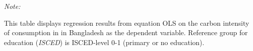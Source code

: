 \begin{table}[htbp!]
\begin{adjustbox}{width = 1\textwidth, max height = 0.95\textheight, center}
\begin{threeparttable}[b]
         \begin{tablenotes}\item \medskip \textit{Note:}
            \item This table displays regression results from equation OLS on the carbon intensity of consumption in  in Bangladesh as the dependent variable. Reference group for education (\textit{ISCED}) is ISCED-level 0-1 (primary or no education).
         \end{tablenotes}
      \end{threeparttable}
   \end{adjustbox}
\end{table}


